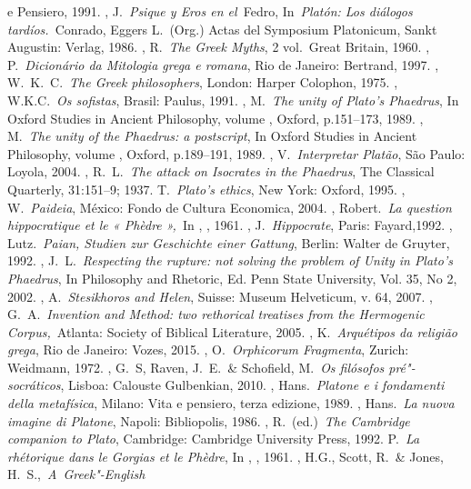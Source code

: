 \begin{bibliohedra}
  e Pensiero, 1991.
, J.~\emph{Psique y Eros en el~}Fedro, In~\emph{Platón: Los
  diálogos tardíos.}~Conrado, Eggers L.~(Org.) Actas del Symposium
  Platonicum, Sankt Augustin: Verlag, 1986.
, R.~\emph{The Greek Myths}, 2 vol.~Great Britain, 1960.
, P.~\emph{Dicionário da Mitologia grega e romana}, Rio de
  Janeiro: Bertrand, 1997.
, W.~K.~C.~\emph{The Greek philosophers}, London: Harper
  Colophon, 1975.
, W.K.C.~\emph{Os sofistas}, Brasil: Paulus, 1991.
, M.~\emph{The unity of Plato's Phaedrus}, In Oxford Studies in
  Ancient Philosophy, volume , Oxford, p.151--173, 1989.
, M.~\emph{The unity of the Phaedrus: a postscript}, In Oxford
  Studies in Ancient Philosophy, volume , Oxford, p.189--191, 1989.
, V.~\emph{Interpretar Platão}, São Paulo: Loyola, 2004.
, R.~L.~\emph{The attack on Isocrates in the Phaedrus}, The
  Classical Quarterly, 31:151--9; 1937.
 T.~\emph{Plato's ethics}, New York: Oxford, 1995.
, W.~\emph{Paideia}, México: Fondo de Cultura Economica, 2004.
, Robert.~\emph{La question hippocratique et le « Phèdre »,}~In
  , , 1961.
, J.~\emph{Hippocrate}, Paris: Fayard,1992.
, Lutz.~\emph{Paian, Studien zur Geschichte einer Gattung},
  Berlin: Walter de Gruyter, 1992.
, J.~L.~\emph{Respecting the rupture: not solving the problem
  of Unity in Plato's Phaedrus}, In Philosophy and Rhetoric, Ed. Penn
  State University, Vol. 35, No 2, 2002.
, A.~\emph{Stesikhoros and Helen}, Suisse: Museum Helveticum, v.
  64, 2007.
, G.~A.~\emph{Invention and Method: two rethorical treatises
  from the Hermogenic Corpus,}~Atlanta: Society of Biblical Literature,
  2005.
, K.~\emph{Arquétipos da religião grega}, Rio de Janeiro:
  Vozes, 2015.
, O.~\emph{Orphicorum Fragmenta}, Zurich: Weidmann, 1972.
, G.~S, Raven, J.~E.~\& Schofield, M.~\emph{Os filósofos
  pré"-socráticos}, Lisboa: Calouste Gulbenkian, 2010.
, Hans.~\emph{Platone e i fondamenti della metafísica}, Milano:
  Vita e pensiero, terza edizione, 1989.
, Hans.~\emph{La nuova imagine di Platone}, Napoli: Bibliopolis,
  1986.
, R.~(ed.)~\emph{The Cambridge companion to Plato}, Cambridge:
  Cambridge University Press, 1992.
 P.~\emph{La rhétorique dans le Gorgias et le Phèdre}, In
  , , 1961.
, H.G., Scott, R.~\& Jones, H.~S.,~\emph{A~Greek"-English
}
\end{bibliohedra}
